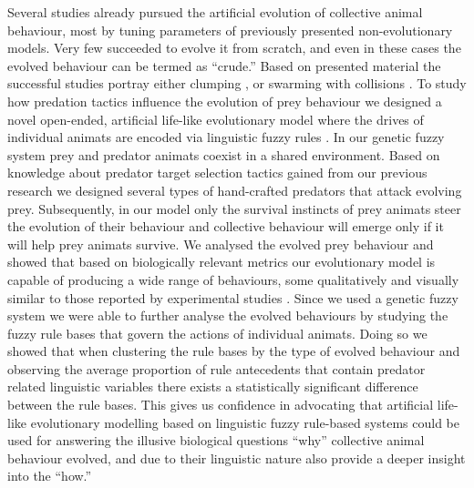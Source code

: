 Several studies already pursued the artificial evolution of collective animal behaviour, most by tuning parameters of previously presented non-evolutionary models. Very few succeeded to evolve it from scratch, and even in these cases the evolved behaviour can be termed as ``crude.'' Based on presented material the successful studies portray either clumping \cite{biswas2014causes,hein2015evolution,witkowski2016emergence}, or swarming with collisions \cite{olson2013predator,olson2015exploring,olson2016evolution,witkowski2016emergence}. To study how predation tactics influence the evolution of prey behaviour we designed a novel open-ended, artificial life-like evolutionary model where the drives of individual animats are encoded via linguistic fuzzy rules \cite{demsar2017evolution}. In our genetic fuzzy system prey and predator animats coexist in a shared environment. Based on knowledge about predator target selection tactics gained from our previous research \cite{demsar2014simulated,demsar2015simulating} we designed several types of hand-crafted predators that attack evolving prey. Subsequently, in our model only the survival instincts of prey animats steer the evolution of their behaviour and collective behaviour will emerge only if it will help prey animats survive. We analysed the evolved prey behaviour and showed that based on biologically relevant metrics \cite{couzin2002collective,vicsek2012collective,tunstrom2013collective} our evolutionary model is capable of producing a wide range of behaviours, some qualitatively and visually similar to those reported by experimental studies \cite{tunstrom2013collective}. Since we used a genetic fuzzy system we were able to further analyse the evolved behaviours by studying the fuzzy rule bases that govern the actions of individual animats. Doing so we showed that when clustering the rule bases by the type of evolved behaviour and observing the average proportion of rule antecedents that contain predator related linguistic variables there exists a statistically significant difference between the rule bases. This gives us confidence in advocating that artificial life-like evolutionary modelling based on linguistic fuzzy rule-based systems could be used for answering the illusive biological questions ``why'' collective animal behaviour evolved, and due to their linguistic nature also provide a deeper insight into the ``how.''

